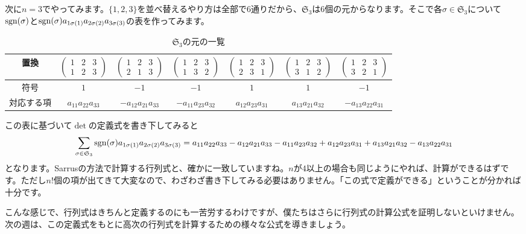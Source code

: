 次に$n = 3$でやってみます。$\{1, 2, 3\}$を並べ替えるやり方は全部で$6$通りだから、$\mathfrak{S}_3$は$6$個の元からなります。そこで各$\sigma \in \mathfrak{S}_3$について$\operatorname{sgn}(\sigma)$と$\operatorname{sgn}(\sigma) a_{1\sigma(1)} a_{2\sigma(2)} a_{3\sigma(3)}$の表を作ってみます。
\begin{table}[h!tbp]
\centering
\caption{$\mathfrak{S}_3$の元の一覧}
\begin{tabular}{c||cccccc} \hline
置換 &
$\begin{pmatrix}
1 & 2 & 3 \\
1 & 2 & 3
\end{pmatrix}$ & 
$\begin{pmatrix}
1 & 2 & 3 \\
2 & 1 & 3
\end{pmatrix}$ & 
$\begin{pmatrix}
1 & 2 & 3 \\
1 & 3 & 2
\end{pmatrix}$ & 
$\begin{pmatrix}
1 & 2 & 3 \\
2 & 3 & 1
\end{pmatrix}$ & 
$\begin{pmatrix}
1 & 2 & 3 \\
3 & 1 & 2
\end{pmatrix}$ & 
$\begin{pmatrix}
1 & 2 & 3 \\
3 & 2 & 1
\end{pmatrix}$ \\ \hline
符号 & $1$ & $-1$ & $-1$ & $1$ & $1$ & $-1$ \\ \hline
対応する項 & $a_{11} a_{22} a_{33}$ & $-a_{12} a_{21} a_{33}$ & $-a_{11} a_{23} a_{32}$ & $a_{12} a_{23} a_{31}$ & $a_{13} a_{21} a_{32}$ & $-a_{13} a_{22} a_{31}$ \\ \hline
\end{tabular}
\end{table}

この表に基づいて$\det$の定義式を書き下してみると
\[
\sum_{\sigma \in \mathfrak{S}_3} \operatorname{sgn}(\sigma) a_{1 \sigma(1)} a_{2 \sigma(2)} a_{3 \sigma(3)}
= a_{11} a_{22} a_{33} - a_{12} a_{21} a_{33} - a_{11} a_{23} a_{32} + a_{12} a_{23} a_{31} + a_{13} a_{21} a_{32} - a_{13} a_{22} a_{31}
\]
となります。Sarrusの方法で計算する行列式と、確かに一致していますね。$n$が$4$以上の場合も同じようにやれば、計算ができるはずです。ただし$n!$個の項が出てきて大変なので、わざわざ書き下してみる必要はありません。「この式で定義ができる」ということが分かれば十分です。

こんな感じで、行列式はきちんと定義するのにも一苦労するわけですが、僕たちはさらに行列式の計算公式を証明しないといけません。次の週は、この定義式をもとに高次の行列式を計算するための様々な公式を導きましょう。

